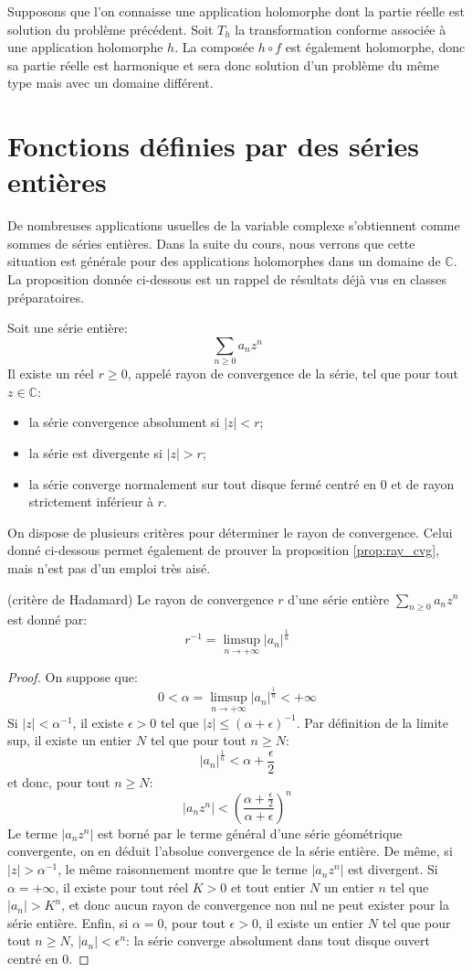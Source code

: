 Supposons que l'on connaisse une application holomorphe dont la
partie réelle est solution du problème précédent. Soit $T_h$ la
transformation conforme associée à une application holomorphe $h$. La
composée $h \circ f$ est également holomorphe, donc sa partie réelle
est harmonique et sera donc solution d'un problème du même type mais
avec un domaine différent.

\section{Fonctions définies par des séries entières}
De nombreuses applications usuelles de la variable complexe s'obtiennent comme 
sommes de séries entières. Dans la suite du cours, nous verrons que cette
situation est générale pour des applications holomorphes dans un domaine de
$\mathbb{C}$. La proposition donnée ci-dessous est un rappel de résultats déjà
vus en classes préparatoires.
\begin{fprop}\label{prop:ray_cvg}
Soit une série entière:
\[
\sum_{n \geq 0} a_n z^n
\]
Il existe un réel $r \geq 0$, appelé rayon de convergence de la série, tel que
pour tout $z \in \mathbb{C}$:
\begin{itemize}
  \item la série convergence absolument si $|z| < r$;
  \item la série est divergente si $|z|>r$;
  \item la série converge normalement sur tout disque fermé centré en 0 et de
  rayon strictement inférieur à $r$.
\end{itemize}
\end{fprop}
On dispose de plusieurs critères pour déterminer le rayon de convergence. Celui
donné ci-dessous permet également de prouver la proposition \ref{prop:ray_cvg},
mais n'est pas d'un emploi très aisé.
\begin{fprop}(critère de Hadamard)
Le rayon de convergence $r$ d'une série entière $\sum_{n \geq 0} a_n z^n$ est
donné par:
\[
r^{-1}=\limsup_{n \to +\infty} |a_n|^{\frac{1}{n}}
\]
\end{fprop}
\begin{proof}
On suppose que: 
\[
0 < \alpha = \limsup_{n \to +\infty} |a_n|^{\frac{1}{n}} <
+\infty
\]
Si $|z|<\alpha^{-1}$, il existe $\epsilon > 0$ tel que $|z|\leq
(\alpha+\epsilon)^{-1}$. Par définition de la limite sup, il existe un entier
$N$ tel que pour tout $n \geq N$:
\[
|a_n|^{\frac{1}{n}} < \alpha + \frac{\epsilon}{2}
\]
et donc, pour tout $n \geq N$:
\[
\left|a_nz^n\right|< \left(\frac{\alpha + \frac{\epsilon}{2}}{\alpha +
\epsilon}\right)^n
\]
Le terme $|a_nz^n|$ est borné par le terme général d'une série géométrique
convergente, on  en déduit l'absolue convergence de la série entière.
De même, si $|z|> \alpha^{-1}$, le même raisonnement montre que le terme
$\left|a_nz^n\right|$ est divergent. Si $\alpha = +\infty$, il existe pour tout
réel $K>0$ et tout entier $N$ un entier $n$ tel que $|a_n|>K^n$, et donc aucun
rayon de convergence non nul ne peut exister pour la série entière. Enfin, si
$\alpha = 0$, pour tout $\epsilon > 0$, il existe un entier $N$ tel que pour
tout $n \geq N$, $|a_n|<\epsilon^n$: la série converge absolument dans tout
disque ouvert centré en 0.
\end{proof}
